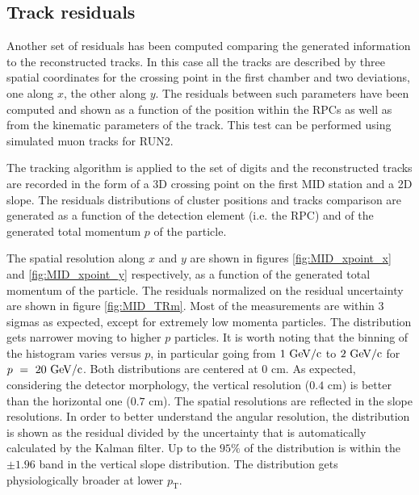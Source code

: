 \subsection{Track residuals}
Another set of residuals has been computed comparing the generated information to the reconstructed tracks.
In this case all the tracks are described by three spatial coordinates for the crossing point in the first chamber and two deviations, one along $x$, the other along $y$.
The residuals between such parameters have been computed and shown as a function of the position within the RPCs as well as from the kinematic parameters of the track.
This test can be performed using simulated muon tracks for RUN2.

The tracking algorithm is applied to the set of digits and the reconstructed tracks are recorded in the form of a 3D crossing point on the first MID station and a 2D slope.
The residuals distributions of cluster positions and tracks comparison are generated as a function of the detection element (i.e. the RPC) and of the generated total momentum $p$ of the particle.

The spatial resolution along $x$ and $y$ are shown in figures \ref{fig:MID_xpoint_x} and \ref{fig:MID_xpoint_y} respectively, as a function of the generated total momentum of the particle.
The residuals normalized on the residual uncertainty are shown in figure \ref{fig:MID_TRm}.
Most of the measurements are within 3 sigmas as expected, except for extremely low momenta particles.
The distribution gets narrower moving to higher $p$ particles.
It is worth noting that the binning of the histogram varies versus $p$, in particular going from $1\ \rm GeV/c$ to $2\ \rm GeV/c$ for $p\ =\ 20\ \rm GeV/c$.
Both distributions are centered at $0$ cm.
As expected, considering the detector morphology, the vertical resolution ($0.4$ cm) is better than the horizontal one ($0.7$ cm).
The spatial resolutions are reflected in the slope resolutions.
In order to better understand the angular resolution, the distribution is shown as the residual divided by the uncertainty that is automatically calculated by the Kalman filter.
Up to the $95\%$ of the distribution is within the $\pm1.96$ band in the vertical slope distribution.
The distribution gets physiologically broader at lower $p_\mathrm{T}$.


